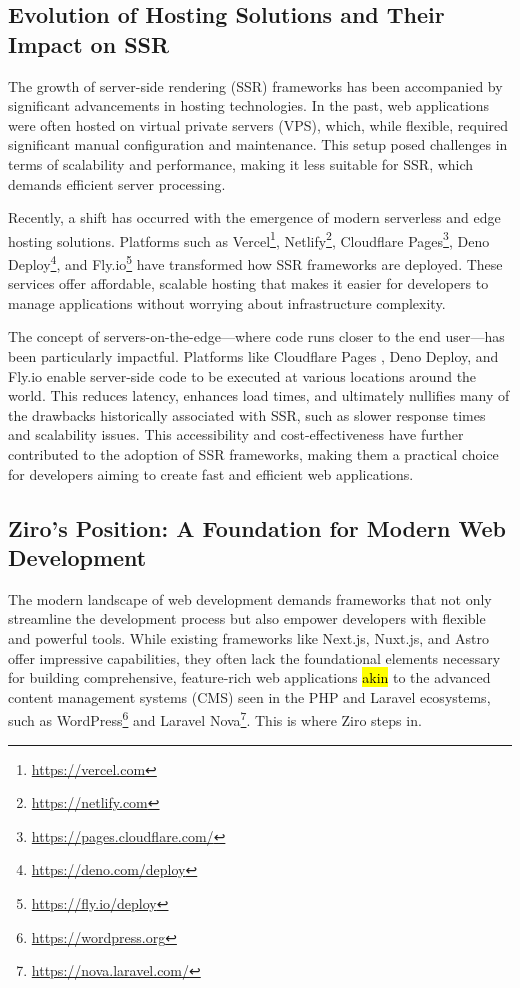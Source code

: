 \subsection{Evolution of Hosting Solutions and Their Impact on SSR}

The growth of server-side rendering (SSR) frameworks has been accompanied by significant advancements in hosting technologies. In the past, web applications were often hosted on virtual private servers (VPS), which, while flexible, required significant manual configuration and maintenance. This setup posed challenges in terms of scalability and performance, making it less suitable for SSR, which demands efficient server processing.

Recently, a shift has occurred with the emergence of modern serverless and edge hosting solutions. Platforms such as Vercel\footnote{\url{https://vercel.com}}, Netlify\footnote{\url{https://netlify.com}}, Cloudflare Pages\footnote{\url{https://pages.cloudflare.com/}}, Deno Deploy\footnote{\url{https://deno.com/deploy}}, and Fly.io\footnote{\url{https://fly.io/deploy}} have transformed how SSR frameworks are deployed. These services offer affordable, scalable hosting that makes it easier for developers to manage applications without worrying about infrastructure complexity.

The concept of servers-on-the-edge—where code runs closer to the end user—has been particularly impactful. Platforms like Cloudflare Pages
, Deno Deploy, and Fly.io enable server-side code to be executed at various locations around the world. This reduces latency, enhances load times, and ultimately nullifies many of the drawbacks historically associated with SSR, such as slower response times and scalability issues. This accessibility and cost-effectiveness have further contributed to the adoption of SSR frameworks, making them a practical choice for developers aiming to create fast and efficient web applications.

\subsection{Ziro’s Position: A Foundation for Modern Web Development}

The modern landscape of web development demands frameworks that not only streamline the development process but also empower developers with flexible and powerful tools. While existing frameworks like Next.js, Nuxt.js, and Astro offer impressive capabilities, they often lack the foundational elements necessary for building comprehensive, feature-rich web applications \hl{akin} to the advanced content management systems (CMS) seen in the PHP and Laravel ecosystems, such as WordPress\footnote{\url{https://wordpress.org}} and Laravel Nova\footnote{\url{https://nova.laravel.com/}}. This is where Ziro steps in.

